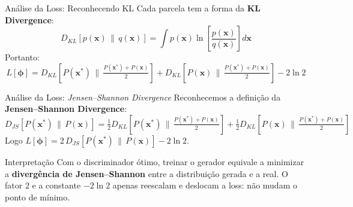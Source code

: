 \documentclass[aspectratio=169,xcolor=dvipsnames]{beamer}
\begin{document}
  \begin{frame}{Análise da Loss: Reconhecendo KL}
    Cada parcela tem a forma da \textbf{KL Divergence}:
    \vspace{0.3em}
    \[
      D_{KL}\!\left[p(\mathbf{x}) \,\|\, q(\mathbf{x})\right] = \int p(\mathbf{x})\ln\!\left[\frac{p(\mathbf{x})}{q(\mathbf{x})}\right] d\mathbf{x}
    \]
    \vspace{0.3em}
    Portanto:
    \[
      L[\bm{\phi}] = D_{KL}\!\left[P(\mathbf{x}^{*}) \,\Big\|\, \tfrac{P(\mathbf{x}^{*})+P(\mathbf{x})}{2}\right]
             + D_{KL}\!\left[P(\mathbf{x}) \,\Big\|\, \tfrac{P(\mathbf{x}^{*})+P(\mathbf{x})}{2}\right] - 2\ln 2
    \]
  \end{frame}

  \begin{frame}{Análise da Loss: \textit{Jensen--Shannon Divergence}}
    Reconhecemos a definição da \textbf{Jensen--Shannon Divergence}:
    \vspace{0.3em}
    \[
      D_{JS}\!\left[P(\mathbf{x}^{*}) \,\|\, P(\mathbf{x})\right]
      = \tfrac{1}{2} D_{KL}\!\left[P(\mathbf{x}^{*}) \,\Big\|\, \tfrac{P(\mathbf{x}^{*})+P(\mathbf{x})}{2}\right]
      + \tfrac{1}{2} D_{KL}\!\left[P(\mathbf{x}) \,\Big\|\, \tfrac{P(\mathbf{x}^{*})+P(\mathbf{x})}{2}\right]
    \]
    \vspace{0.2em}
    Logo $L[\bm{\phi}] = 2\,D_{JS}\!\left[P(\mathbf{x}^{*}) \,\|\, P(\mathbf{x})\right] - 2\ln 2$.
    \begin{alertblock}{Interpretação}
      Com o discriminador ótimo, treinar o gerador equivale a minimizar a
      \textbf{divergência de Jensen--Shannon} entre a distribuição gerada
      e a real. O fator $2$ e a constante $-2\ln 2$ apenas reescalam e
      deslocam a loss: não mudam o ponto de mínimo.
    \end{alertblock}
  \end{frame}
\end{document}
